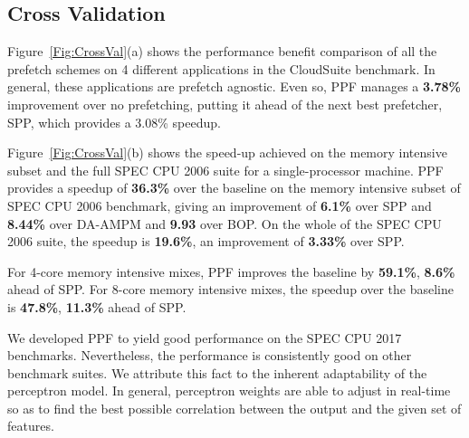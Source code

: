 \subsection{Cross Validation}
\label{Results-CrossVal}

%
%

Figure~\ref{Fig:CrossVal}(a) shows the performance benefit comparison
of all the prefetch schemes on 4 different applications in the
CloudSuite benchmark.  In general, these applications are prefetch
agnostic.  Even so, PPF manages a \textbf{3.78\%} improvement over no
prefetching, putting it ahead of the next best prefetcher, SPP, which
provides a 3.08\% speedup.

Figure~\ref{Fig:CrossVal}(b) shows the speed-up achieved on the memory
intensive subset and the full SPEC CPU 2006 suite for a
single-processor machine.  PPF provides a speedup of \textbf{36.3\%}
over the baseline on the memory intensive subset of SPEC CPU 2006
benchmark, giving an improvement of \textbf{6.1\%} over SPP and
\textbf{8.44\%} over DA-AMPM and \textbf{9.93} over BOP. On the whole
of the SPEC CPU 2006 suite, the speedup is \textbf{19.6\%}, an
improvement of \textbf{3.33\%} over SPP.

For 4-core memory intensive mixes, PPF improves the baseline by
\textbf{59.1\%}, \textbf{8.6\%} ahead of SPP. For 8-core memory
intensive mixes, the speedup over the baseline is \textbf{47.8\%},
\textbf{11.3\%} ahead of SPP.

We developed PPF to yield good performance on the SPEC CPU 2017
benchmarks.  Nevertheless, the performance is consistently good on
other benchmark suites.  We attribute this fact to the inherent
adaptability of the perceptron model.  In general, perceptron weights
are able to adjust in real-time so as to find the best possible
correlation between the output and the given set of features.
